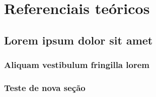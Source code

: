 \part{Referenciais teóricos}

\chapter{Lorem ipsum dolor sit amet}

\section{Aliquam vestibulum fringilla lorem}

\lipsum[1]

\section{Teste de nova seção}

\lipsum[2-3]
